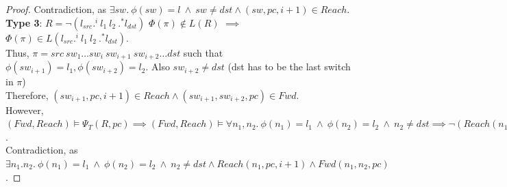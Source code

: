 \begin{proof}
	Contradiction, as $\exists sw. ~ \phi(sw) = l ~\wedge~ sw \not= dst \wedge (sw,pc,i+1) \in Reach$.
	\newline \newline
	\textbf{Type 3}: $R = \neg (l_{src} .^i \ l_1 \ l_2 \ .^* l_{dst})$ \newline
	$\Phi(\pi) \not\in L(R)$ $\implies$ $\Phi(\pi) \in L (l_{src} .^i \ l_1 \ l_2 \ .^* l_{dst})$. \\
	Thus, $\pi = src\ sw_1 \ldots sw_i \ sw_{i+1} \ sw_{i+2} \ldots dst$ such that $\phi(sw_{i+1}) = l_1, \phi(sw_{i+2}) = l_2$. Also $sw_{i+2} \not=dst$ (dst has to be the last switch in $\pi$)\\
	Therefore,  $(sw_{i+1}, pc, i+1) \in Reach \wedge (sw_{i+1}, sw_{i+2}, pc) \in Fwd$. \\
	However,
	$(Fwd, Reach) \models \Psi_T(R, pc) \implies (Fwd, Reach) \models \forall n_1, n_2.~\phi(n_1) = l_1~\wedge~ \phi(n_2) = l_2 ~\wedge~ n_2 \not=dst  \implies 
	\neg (Reach(n_1, pc, i + 1) \wedge Fwd(n_1, n_2, pc))$. \\
	Contradiction, as $\exists n_1. n_2. ~\phi(n_1) = l_1~\wedge~ \phi(n_2) = l_2 ~\wedge~ n_2 \not=dst \wedge Reach(n_1, pc, i + 1) \wedge Fwd(n_1, n_2, pc)$. 
\end{proof}
\fi

